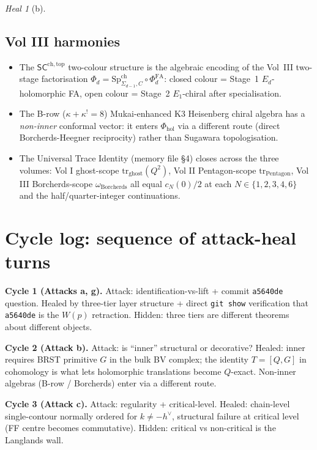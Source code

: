 \documentclass{article}
\theoremstyle{definition}
\theoremstyle{remark}
\newtheorem{heal}[theorem]{Heal}
\newcommand{\SCchtop}{\mathsf{SC}^{\mathrm{ch,top}}}
\newcommand{\Phihol}{\Phi_{\mathrm{hol}}}
\begin{document}
\begin{heal}[b]
\subsection{Vol III harmonies}
\begin{itemize}
\item The $\SCchtop$ two-colour structure is the
algebraic encoding of the Vol~III two-stage factorisation
$\Phi_d = \mathrm{Sp}^{\mathrm{ch}}_{\Sigma_{d-1}, C} \circ
\Phi^{\mathrm{FA}}_d$: closed colour = Stage~1
$E_d$-holomorphic FA, open colour = Stage~2
$E_1$-chiral after specialisation.
\item The B-row ($\kappa + \kappa^! = 8$) Mukai-enhanced K3
Heisenberg chiral algebra has a \emph{non-inner} conformal
vector: it enters $\Phihol$ via a different route (direct
Borcherds-Heegner reciprocity) rather than Sugawara
topologisation.
\item The Universal Trace Identity
(memory file \S4) closes across the three volumes: Vol I
ghost-scope $\mathrm{tr}_{\mathrm{ghost}}(Q^2)$, Vol II
Pentagon-scope $\mathrm{tr}_{\mathrm{Pentagon}}$, Vol III
Borcherds-scope $\omega_{\mathrm{Borcherds}}$ all equal
$c_N(0)/2$ at each $N \in \{1,2,3,4,6\}$ and the
half/quarter-integer continuations.
\end{itemize}

\section{Cycle log: sequence of attack-heal turns}
\label{sec:opus-log}

\textbf{Cycle 1 (Attacks a, g).}
Attack: identification-vs-lift + commit \texttt{a5640de}
question. Healed by three-tier layer structure + direct
\texttt{git show} verification that \texttt{a5640de} is the
$W(p)$ retraction. Hidden: three tiers are different
theorems about different objects.

\textbf{Cycle 2 (Attack b).}
Attack: is ``inner'' structural or decorative? Healed:
inner requires BRST primitive $G$ in the bulk BV complex;
the identity $T = [Q, G]$ in cohomology is what lets
holomorphic translations become $Q$-exact. Non-inner
algebras (B-row / Borcherds) enter via a different route.

\textbf{Cycle 3 (Attack c).}
Attack: regularity + critical-level. Healed: chain-level
single-contour normally ordered for $k \neq -h^\vee$,
structural failure at critical level (FF centre becomes
commutative). Hidden: critical vs non-critical is the
Langlands wall.


\end{heal}
\end{document}
